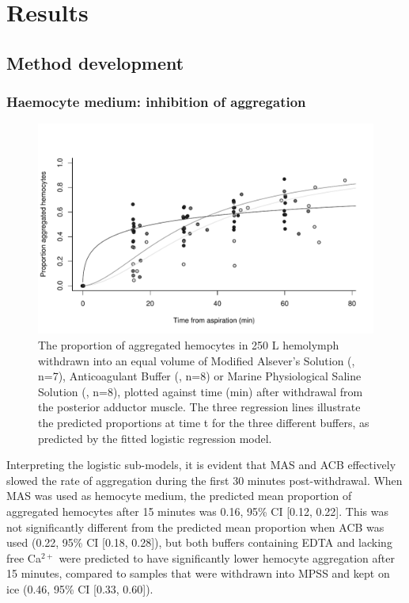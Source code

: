 \chapter{Results}
\label{chap:results}

\section{Method development}
\label{section:Results_Method_Development}
\subsection{Haemocyte medium: inhibition of aggregation}

\begin{figure}[!ht]
    \centering
    \includegraphics[width=1.0\textwidth]{figures/Method development/agg_plot_scaled.pdf}
    \caption{The proportion of aggregated hemocytes in 250 \micro L hemolymph withdrawn into an equal volume of Modified Alsever's Solution (\protect\lysegraacircle, n=7), Anticoagulant Buffer (\protect\graycircle, n=8) or Marine Physiological Saline Solution (\protect\darkgraycircle, n=8), plotted against time (min) after withdrawal from the posterior adductor muscle. The three regression lines illustrate the predicted proportions at time t for the three different buffers, as predicted by the fitted logistic regression model.}
    \label{fig:aggregation}
\end{figure}

Interpreting the logistic sub-models, it is evident that MAS and ACB effectively slowed the rate of aggregation during the first 30 minutes post-withdrawal. When MAS was used as hemocyte medium, the predicted mean proportion of aggregated hemocytes after 15 minutes was 0.16, 95\% CI [0.12, 0.22]. This was not significantly different from the predicted mean proportion when ACB was used (0.22, 95\% CI [0.18, 0.28]), but both buffers containing EDTA and lacking free Ca$^{2+}$ were predicted to have significantly lower hemocyte aggregation after 15 minutes, compared to samples that were withdrawn into MPSS and kept on ice (0.46, 95\% CI [0.33, 0.60]).

